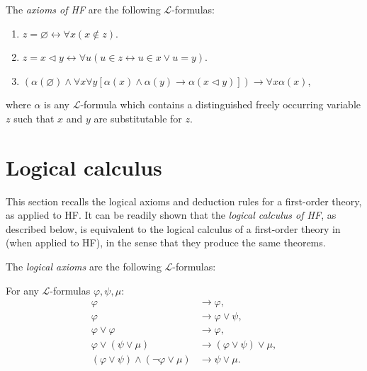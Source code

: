 \begin{definition}
    \label{def:Axioms}
    \leanok
    The \textit{axioms of HF} are the following $\mathcal{L}$-formulas:
    \begin{enumerate}
        \item $z=\varnothing \leftrightarrow \forall x(x \notin z)$.
        \item $z=x \lhd y \leftrightarrow \forall u(u \in z \leftrightarrow u \in x \lor u=y)$.
        \item $(\alpha(\varnothing) \land \forall x \forall y[\alpha(x) \land \alpha(y) \rightarrow 
        \alpha(x \lhd y)]) \rightarrow \forall x \alpha(x)$,
    \end{enumerate}
    where $\alpha$ is any $\mathcal{L}$-formula which contains a 
    distinguished freely occurring variable $z$ such that $x$ and $y$ are substitutable for $z$.
\end{definition}

\section{Logical calculus}

This section recalls the logical axioms and deduction rules for a first-order theory, 
as applied to HF. 
It can be readily shown that the \textit{logical calculus of HF}, as described below, 
is equivalent to the logical calculus of a first-order theory in \cite{shoenfield1967mathematical} 
(when applied to HF), in the sense that they produce the same theorems.

The \textit{logical axioms} are the following $\mathcal{L}$-formulas:

\begin{definition}
    \label{def:Bool.Axioms}
    \leanok
    For any $\mathcal{L}$-formulas $\varphi, \psi, \mu$:
    $$
    \begin{aligned}
    \varphi & \rightarrow \varphi, \\
    \varphi & \rightarrow \varphi \lor \psi, \\
    \varphi \lor \varphi & \rightarrow \varphi, \\
    \varphi \lor(\psi \lor \mu) & \rightarrow(\varphi \lor \psi) \lor \mu, \\
    (\varphi \lor \psi) \land(\neg \varphi \lor \mu) & \rightarrow \psi \lor \mu .
    \end{aligned}
    $$
\end{definition}

